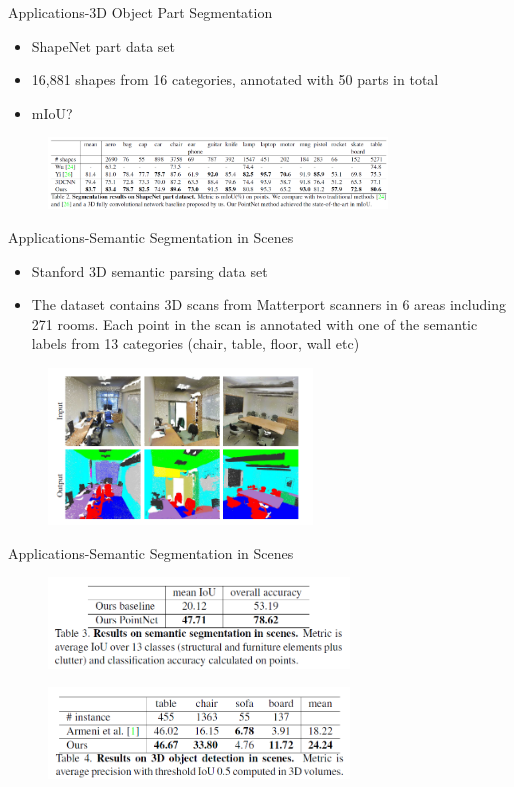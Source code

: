 \documentclass[serif,mathserif]{beamer}
\begin{document}
\begin{frame}{Applications-3D Object Part Segmentation }
	\begin{itemize}
		\item ShapeNet part data set
		\item 16,881 shapes from 16 categories, annotated with 50 parts in total
		\item mIoU?
	\end{itemize}
	\begin{figure}
		\includegraphics[width=9cm]{image/seg.png}
	\end{figure}
\end{frame}

\begin{frame}{Applications-Semantic Segmentation in Scenes }
	\begin{itemize}
		\item Stanford 3D semantic parsing data set
		\item The dataset contains 3D scans from Matterport scanners in 6 areas including 271 rooms. Each point in the scan is annotated with one of the semantic labels from 13 categories (chair, table, floor, wall etc)
	\end{itemize}
	\begin{figure}
		\includegraphics[width=7cm]{image/sematic.png}
	\end{figure}
\end{frame}

\begin{frame}{Applications-Semantic Segmentation in Scenes}
	\begin{figure}
		\includegraphics[width=8cm]{image/scencs1.png}
	\end{figure}
	\begin{figure}
		\includegraphics[width=8cm]{image/scencs2.png}
	\end{figure}
\end{frame}
\end{document}
